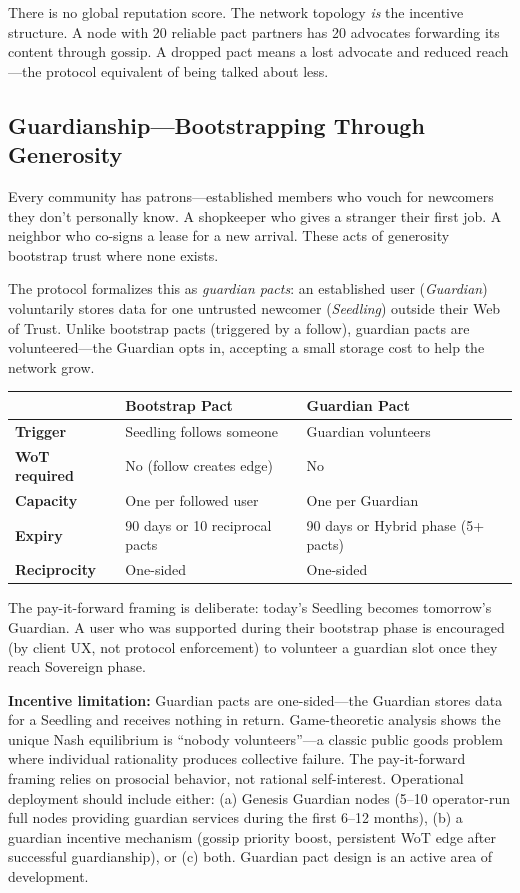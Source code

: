 \documentclass[11pt,a4paper]{article}
\begin{document}
There is no global reputation score. The network topology \emph{is} the incentive structure. A node with 20 reliable pact partners has 20 advocates forwarding its content through gossip. A dropped pact means a lost advocate and reduced reach---the protocol equivalent of being talked about less.

\subsection{Guardianship---Bootstrapping Through Generosity}

Every community has patrons---established members who vouch for newcomers they don't personally know. A shopkeeper who gives a stranger their first job. A neighbor who co-signs a lease for a new arrival. These acts of generosity bootstrap trust where none exists.

The protocol formalizes this as \emph{guardian pacts}: an established user (\emph{Guardian}) voluntarily stores data for one untrusted newcomer (\emph{Seedling}) outside their Web of Trust. Unlike bootstrap pacts (triggered by a follow), guardian pacts are volunteered---the Guardian opts in, accepting a small storage cost to help the network grow.

\begin{table}[h]
\centering
\small
\begin{tabular}{lll}
\toprule
 & \textbf{Bootstrap Pact} & \textbf{Guardian Pact} \\
\midrule
\textbf{Trigger} & Seedling follows someone & Guardian volunteers \\
\textbf{WoT required} & No (follow creates edge) & No \\
\textbf{Capacity} & One per followed user & One per Guardian \\
\textbf{Expiry} & 90 days or 10 reciprocal pacts & 90 days or Hybrid phase (5+ pacts) \\
\textbf{Reciprocity} & One-sided & One-sided \\
\bottomrule
\end{tabular}
\end{table}

The pay-it-forward framing is deliberate: today's Seedling becomes tomorrow's Guardian. A user who was supported during their bootstrap phase is encouraged (by client UX, not protocol enforcement) to volunteer a guardian slot once they reach Sovereign phase.

\textbf{Incentive limitation:} Guardian pacts are one-sided---the Guardian stores data for a Seedling and receives nothing in return. Game-theoretic analysis shows the unique Nash equilibrium is ``nobody volunteers''---a classic public goods problem where individual rationality produces collective failure. The pay-it-forward framing relies on prosocial behavior, not rational self-interest. Operational deployment should include either: (a) Genesis Guardian nodes (5--10 operator-run full nodes providing guardian services during the first 6--12 months), (b) a guardian incentive mechanism (gossip priority boost, persistent WoT edge after successful guardianship), or (c) both. Guardian pact design is an active area of development.
\end{document}
